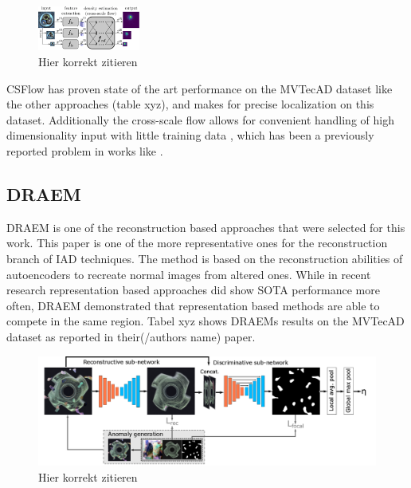 \begin{figure}[ht]
    \centering
    \includegraphics[width=0.3\textwidth]{figures/csflow_pipeline.png}
    \caption{Hier korrekt zitieren}
    \label{fig:csflowpipeline}
\end{figure}

CSFlow has proven state of the art performance on the MVTecAD dataset like the other approaches (table xyz), and makes for precise localization on this dataset. Additionally the cross-scale flow allows 
for convenient handling of high dimensionality input with little training data \cite{csflow2022}, which has been a previously reported problem in works like \cite{Rudolph_2021badNF}.


\subsection{DRAEM}
\label{subsec:DRAEM}

DRAEM \cite{Zavrtanik_2021DRAEM} is one of the reconstruction based approaches that were selected for this work. This paper is one of the more representative ones for the reconstruction branch of 
IAD techniques. The method is based on the reconstruction abilities of autoencoders to recreate normal images from altered ones. While in recent research representation based approaches did 
show SOTA performance more often, DRAEM demonstrated that representation based methods are able to compete in the same region. Tabel xyz shows DRAEMs results on the MVTecAD dataset as reported 
in their(/authors name) paper.\newline

\begin{figure}[ht]
    \centering
    \includegraphics[width=\textwidth]{figures/DRAEM_pipeline.png}
    \caption{Hier korrekt zitieren}
    \label{fig:draempipeline}
\end{figure}

